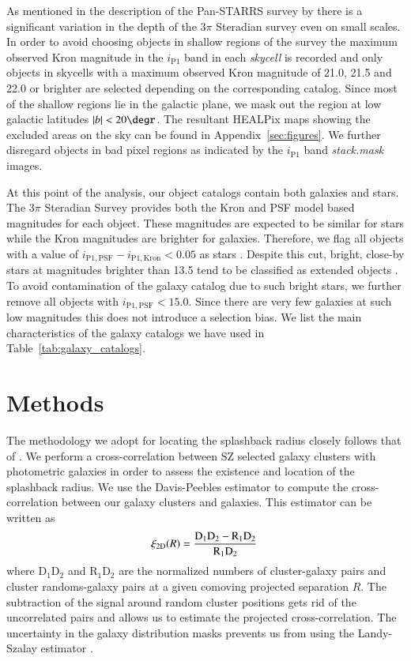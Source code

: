 \documentclass[iop, apjl, twocolappendix, numberedappendix]{emulateapj}
\begin{document}
As mentioned in the description of the Pan-STARRS survey by
\citet{chambers2016pan} there is a significant variation in the
depth of the 3$\pi$ Steradian survey even on small scales. In order
to avoid choosing objects in shallow regions of the survey the
maximum observed Kron magnitude in the $i_{\mathrm{P1}}$ band in
each \textit{skycell} is recorded and only objects in skycells with
a maximum observed Kron magnitude of 21.0, 21.5 and 22.0 or brighter
are selected depending on the corresponding catalog. Since most of
the shallow regions lie in the galactic plane, we mask out the
region at low galactic latitudes $|b|<20\degr$. The resultant
HEALPix maps showing the excluded areas on the sky can be found in
Appendix~\ref{sec:figures}. We further disregard objects in bad
pixel regions as indicated by the $i_{\mathrm{P1}}$ band
\textit{stack.mask} images.

At this point of the analysis, our object catalogs contain both
galaxies and stars. The 3$\pi$ Steradian Survey provides both the
Kron and PSF model based magnitudes for each object. These
magnitudes are expected to be similar for stars while the Kron
magnitudes are brighter for galaxies. Therefore, we flag all objects
with a value of $i_{\mathrm{P1,PSF}} - i_{\mathrm{P1,Kron}}< 0.05$
as stars \citep{farrow2013pan}. Despite this cut, bright, close-by
stars at magnitudes brighter than 13.5 tend to be classified as
extended objects \citep{chambers2016pan}. To avoid contamination of
the galaxy catalog due to such bright stars, we further remove all
objects with $i_{\mathrm{P1,PSF}} < 15.0$. Since there are very few
galaxies at such low magnitudes this does not introduce a selection
bias. We list the main characteristics of the galaxy catalogs we
have used in Table~\ref{tab:galaxy_catalogs}.

\section{Methods}
\label{sec:estimators}
The methodology we adopt for locating the splashback radius closely
follows that of \citet{more2016detection}. We perform a
cross-correlation between SZ selected galaxy clusters with photometric
galaxies in order to assess the existence and location of the
splashback radius. We use the Davis-Peebles estimator
\citep{davis1983survey} to compute the cross-correlation between our
galaxy clusters and galaxies. This estimator can be written as
\begin{equation}
\xi_{\rm 2D}(R) = \frac{\rm D_1D_2-R_1D_2}{\rm R_1D_2}\,
\end{equation}
where D$_1$D$_2$ and R$_1$D$_2$ are the normalized numbers of
cluster-galaxy pairs and cluster randoms-galaxy pairs at a given
comoving projected separation $R$. The subtraction of the signal
around random cluster positions gets rid of the uncorrelated pairs and allows
us to estimate the projected cross-correlation. The uncertainty in the galaxy
distribution masks prevents us from using the Landy-Szalay estimator \citep{landy1993bias}.
\end{document}
